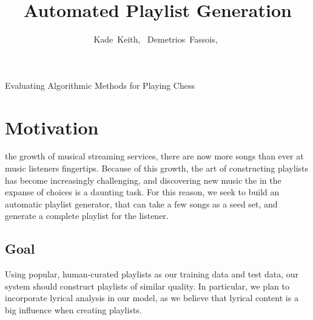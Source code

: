 \documentclass[10pt,journal,compsoc]{IEEEtran}
\begin{document}
\title{Automated Playlist Generation\\}

\author{
  Kade~Keith,~
  Demetrios~Fassois,~
}

%
{Evaluating Algorithmic Methods for Playing Chess}


\maketitle

\section{Motivation}

 the growth of musical streaming services, there are now more songs than ever at music listeners fingertips. Because of this growth, the art of constructing playlists has become increasingly challenging, and discovering new music the in the expanse of choices is a daunting task. For this reason, we seek to build an automatic playlist generator, that can take a few songs as a seed set, and generate a complete playlist for the listener.

\subsection{Goal}
Using popular, human-curated playlists as our training data and test data, our system should construct playlists of similar quality. In particular, we plan to incorporate lyrical analysis in our model, as we believe that lyrical content is a big influence when creating playlists.
\end{document}
